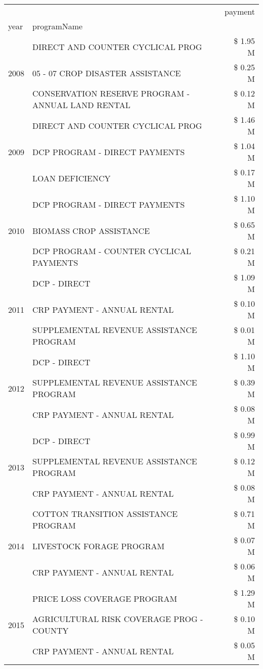 \begin{tabular}{llr}
\toprule
 &  & payment \\
year & programName &  \\
\midrule
\multirow[t]{3}{*}{2008} & DIRECT AND COUNTER CYCLICAL PROG & \$ 1.95 M \\
 & 05 - 07 CROP DISASTER ASSISTANCE & \$ 0.25 M \\
 & CONSERVATION RESERVE PROGRAM - ANNUAL LAND RENTAL & \$ 0.12 M \\
\cline{1-3}
\multirow[t]{3}{*}{2009} & DIRECT AND COUNTER CYCLICAL PROG & \$ 1.46 M \\
 & DCP PROGRAM - DIRECT PAYMENTS & \$ 1.04 M \\
 & LOAN DEFICIENCY & \$ 0.17 M \\
\cline{1-3}
\multirow[t]{3}{*}{2010} & DCP PROGRAM - DIRECT PAYMENTS & \$ 1.10 M \\
 & BIOMASS CROP ASSISTANCE & \$ 0.65 M \\
 & DCP PROGRAM - COUNTER CYCLICAL PAYMENTS & \$ 0.21 M \\
\cline{1-3}
\multirow[t]{3}{*}{2011} & DCP - DIRECT & \$ 1.09 M \\
 & CRP PAYMENT - ANNUAL RENTAL & \$ 0.10 M \\
 & SUPPLEMENTAL REVENUE ASSISTANCE PROGRAM & \$ 0.01 M \\
\cline{1-3}
\multirow[t]{3}{*}{2012} & DCP - DIRECT & \$ 1.10 M \\
 & SUPPLEMENTAL REVENUE ASSISTANCE PROGRAM & \$ 0.39 M \\
 & CRP PAYMENT - ANNUAL RENTAL & \$ 0.08 M \\
\cline{1-3}
\multirow[t]{3}{*}{2013} & DCP - DIRECT & \$ 0.99 M \\
 & SUPPLEMENTAL REVENUE ASSISTANCE PROGRAM & \$ 0.12 M \\
 & CRP PAYMENT - ANNUAL RENTAL & \$ 0.08 M \\
\cline{1-3}
\multirow[t]{3}{*}{2014} & COTTON TRANSITION ASSISTANCE PROGRAM & \$ 0.71 M \\
 & LIVESTOCK FORAGE PROGRAM & \$ 0.07 M \\
 & CRP PAYMENT - ANNUAL RENTAL & \$ 0.06 M \\
\cline{1-3}
\multirow[t]{3}{*}{2015} & PRICE LOSS COVERAGE PROGRAM & \$ 1.29 M \\
 & AGRICULTURAL RISK COVERAGE PROG - COUNTY & \$ 0.10 M \\
 & CRP PAYMENT - ANNUAL RENTAL & \$ 0.05 M \\
\cline{1-3}

\end{tabular}
